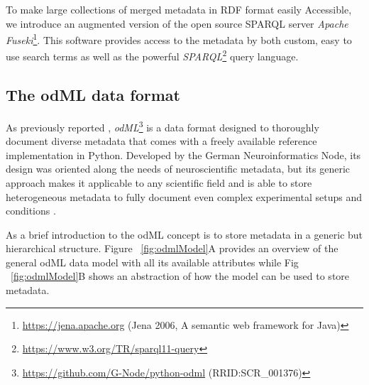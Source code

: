 \documentclass{article}
\begin{document}
To make large collections of merged metadata in RDF format easily Accessible, we introduce an augmented version of the open source SPARQL server \textit{Apache Fuseki}\footnote{\url{https://jena.apache.org} (Jena 2006, A semantic web framework for Java)}. This software provides access to the metadata by both custom, easy to use search terms as well as the powerful \textit{SPARQL}\footnote{\url{https://www.w3.org/TR/sparql11-query}} query language.

\subsection{The odML data format} \label{sec:odml_intro}
As previously reported \cite{Grewe_2011}, \textit{odML}\footnote{\url{https://github.com/G-Node/python-odml} (RRID:SCR\_001376)} is a data format designed to thoroughly document diverse metadata that comes with a freely available reference implementation in Python. Developed by the German Neuroinformatics Node, its design was oriented along the needs of neuroscientific metadata, but its generic approach makes it applicable to any scientific field and is able to store heterogeneous metadata to fully document even complex experimental setups and conditions \cite{Zehl_2016}.

As a brief introduction to the odML concept is to store metadata in a generic but hierarchical structure. Figure ~\ref{fig:odmlModel}A provides an overview of the general odML data model with all its available attributes while Fig ~\ref{fig:odmlModel}B shows an abstraction of how the model can be used to store metadata.
\end{document}
